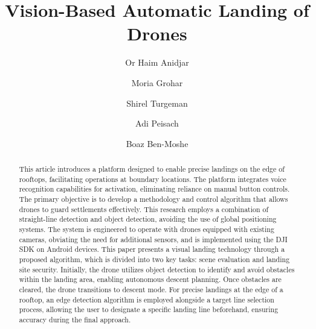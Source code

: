 \documentclass[3p,times]{elsarticle}
\begin{document}
\begin{frontmatter}


\title{Vision-Based Automatic Landing of Drones}




\author[a,b,c,d]{Or Haim Anidjar}

\author[a]{Moria Grohar}

\author[a]{Shirel Turgeman}

\author[a]{Adi Peisach}

\author[a, b, c]{Boaz Ben-Moshe}


\address[a]{School of Computer Science, Ariel University, Golan Heights 1, 4077625, Ariel, Israel.}

\address[b]{Ariel Cyber Innovation Center, Ariel University, Golan Heights 1, 4077625, Ariel, Israel.}

\address[c]{Kinematics and Computational Geometry Lab (K\&CG), Ariel University, Golan Heights 1, 4077625, Ariel, Israel.}

\address[d]{Data Science and Artificial Intelligence Research Center, Ariel University, Golan Heights 1, 4077625, Ariel, Israel.}




\begin{abstract}
This article introduces a platform designed to enable precise landings on the edge of rooftops, facilitating operations at boundary locations. The platform integrates voice recognition capabilities for activation, eliminating reliance on manual button controls. The primary objective is to develop a methodology and control algorithm that allows drones to guard settlements effectively. This research employs a combination of straight-line detection and object detection, avoiding the use of global positioning systems. The system is engineered to operate with drones equipped with existing cameras, obviating the need for additional sensors, and is implemented using the DJI SDK on Android devices. This paper presents a visual landing technology through a proposed algorithm, which is divided into two key tasks: scene evaluation and landing site security. Initially, the drone utilizes object detection to identify and avoid obstacles within the landing area, enabling autonomous descent planning. Once obstacles are cleared, the drone transitions to descent mode. For precise landings at the edge of a rooftop, an edge detection algorithm is employed alongside a target line selection process, allowing the user to designate a specific landing line beforehand, ensuring accuracy during the final approach.


\end{abstract}
\end{frontmatter}
\end{document}
